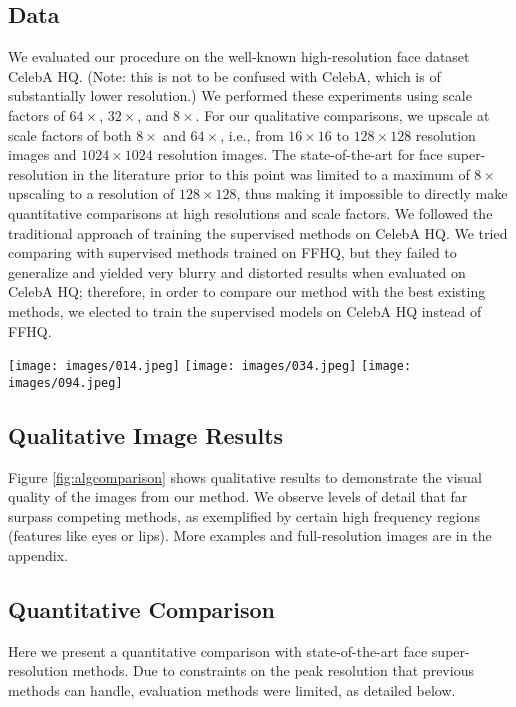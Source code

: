 \documentclass[10pt,twocolumn,letterpaper]{article}
\begin{document}
\subsection{Data}
We evaluated our procedure on the well-known high-resolution face dataset CelebA HQ. (Note: this is not to be confused with CelebA, which is of substantially lower resolution.) We performed these experiments using scale factors of $64 \times$, $32\times$, and $8\times$.
For our qualitative comparisons, we upscale at scale factors of both $8 \times$ and $64 \times$, i.e., from $16 \times 16$ to $128 \times 128$ resolution images and $1024 \times 1024$ resolution images. The state-of-the-art for face super-resolution in the literature prior to this point was limited to a maximum of $8 \times$ upscaling to a resolution of $128 \times 128$, thus making it impossible to directly make quantitative comparisons at high resolutions and scale factors. We followed the traditional approach of training the supervised methods on CelebA HQ. We tried comparing with supervised methods trained on FFHQ, but they failed to generalize and yielded very blurry and distorted results when evaluated on CelebA HQ; therefore, in order to compare our method with the best existing methods, we elected to train the supervised models on CelebA HQ instead of FFHQ. 

\begin{figure*}[!ht]
    \centering
    \texttt{[image: images/014.jpeg]}
    \texttt{[image: images/034.jpeg]}
    \texttt{[image: images/094.jpeg]}
\caption{Comparison of PULSE with bicubic upscaling, FSRNet, and FSRGAN. In the first image, PULSE adds a messy patch in the hair to match the two dark diagonal pixels visible in the middle of the zoomed in LR image.}
    \label{fig:algcomparison}
\end{figure*}

\subsection{Qualitative Image Results}
Figure \ref{fig:algcomparison} shows qualitative results to demonstrate the visual quality of the images from our method. We observe levels of detail that far surpass competing methods, as exemplified by certain high frequency regions (features like eyes or lips). More examples and full-resolution images are in the appendix.

\subsection{Quantitative Comparison} \label{quantcomp}
Here we present a quantitative comparison with state-of-the-art face super-resolution methods. Due to constraints on the peak resolution that previous methods can handle, evaluation methods were limited, as detailed below. 
\end{document}
